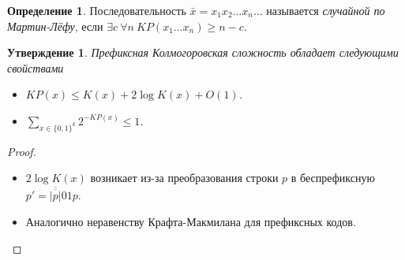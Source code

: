 \documentclass[12pt]{article}
\theoremstyle{definition}
\newtheorem{definition}{Определение}[section]
\theoremstyle{plain}
\newtheorem{statement}{Утверждение}[section]
\theoremstyle{remark}
\begin{document}
\begin{definition}
    Последовательность $\bar x = x_1x_2\dotso x_n\dotso$ называется \emph{случайной по
    Мартин-Лёфу}, если $\exists c\ \forall n\ KP(x_1\dotso x_n) \ge n-c$.
\end{definition}

\begin{statement}
    Префиксная Колмогоровская сложность обладает следующими свойствами
\begin{itemize}
    \item $KP(x)\le K(x) + 2\log K(x) + O(1)$.
    \item $\sum_{x\in \{0,1\}^k} 2^{-KP(x)} \le 1$.
\end{itemize}
\end{statement}
\begin{proof}\mbox{}
\begin{itemize}
    \item $2\log K(x)$ возникает из-за преобразования строки $p$ 
        в беспрефиксную $p' = \overline{\overline{|p|}}01p$.
    \item Аналогично неравенству Крафта-Макмилана для префиксных кодов.
\end{itemize}
\end{proof}
\end{document}

